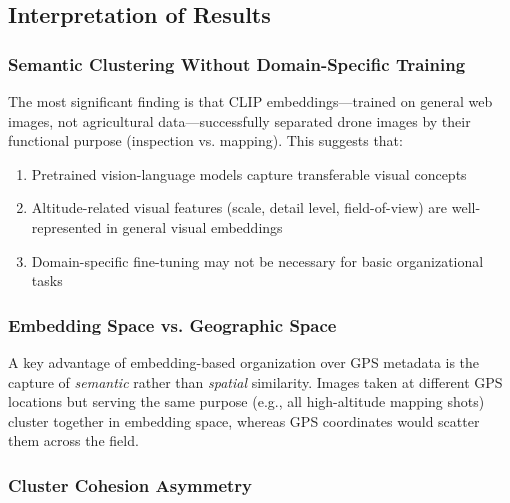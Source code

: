 
\subsection{Interpretation of Results}

\subsubsection{Semantic Clustering Without Domain-Specific Training}

The most significant finding is that CLIP embeddings---trained on general web images, not agricultural data---successfully separated drone images by their functional purpose (inspection vs. mapping). This suggests that:

\begin{enumerate}
    \item Pretrained vision-language models capture transferable visual concepts
    \item Altitude-related visual features (scale, detail level, field-of-view) are well-represented in general visual embeddings
    \item Domain-specific fine-tuning may not be necessary for basic organizational tasks
\end{enumerate}


\subsubsection{Embedding Space vs. Geographic Space}

A key advantage of embedding-based organization over GPS metadata is the capture of \emph{semantic} rather than \emph{spatial} similarity. Images taken at different GPS locations but serving the same purpose (e.g., all high-altitude mapping shots) cluster together in embedding space, whereas GPS coordinates would scatter them across the field.


\subsubsection{Cluster Cohesion Asymmetry}

